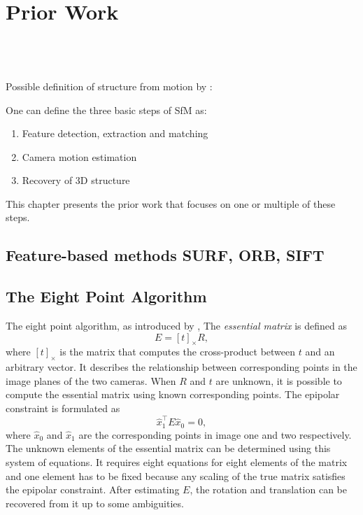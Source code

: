 \chapter{Prior Work}
	
	 \\
	 \\
	 \\
	
	\noindent
	Possible definition of structure from motion by \cite{survey2017}:
	
	
	One can define the three basic steps of SfM as:
	\begin{enumerate}
		\item Feature detection, extraction and matching
		\item Camera motion estimation
		\item Recovery of 3D structure
	\end{enumerate}
	This chapter presents the prior work that focuses on one or multiple of these steps.
	
	\section{Feature-based methods SURF, ORB, SIFT}
	

	\section{The Eight Point Algorithm}
		The eight point algorithm, as introduced by \cite{longuet1981}, 
		The \emph{essential matrix} is defined as 
		\begin{equation}\label{eq:essential_matrix}
			E = \left[ t \right]_\times R,
		\end{equation}
		where $\left[ t \right]_\times$ is the matrix that computes the cross-product between $t$ and an arbitrary vector.
		It describes the relationship between corresponding points in the image planes of the two cameras.
		When $R$ and $t$ are unknown, it is possible to compute the essential matrix using known corresponding points.
		The epipolar constraint is formulated as 
		\begin{equation}\label{eq:epipolar_constraint}
			\hat{x}_1^\top E \hat{x}_0 = 0,
		\end{equation}
		where $\hat{x}_0$ and $\hat{x}_1$ are the corresponding points in image one and two respectively.
		The unknown elements of the essential matrix can be determined using this system of equations.
		It requires eight equations for eight elements of the matrix and one element has to be fixed because any scaling of the true matrix satisfies the epipolar constraint.
		After estimating $E$, the rotation and translation can be recovered from it up to some ambiguities.
		
